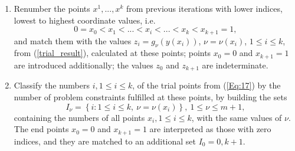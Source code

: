\documentclass{llncs}
\begin{document}
\begin{enumerate}
\item 
Renumber the points $x^1,...,x^k$ from previous iterations with lower indices, lowest to highest 
coordinate values, i.e.
\begin{equation}\label{Eq:17}
0=x_0<x_1<...<x_i<...<x_k<x_{k+1}=1,
\end{equation}
and match them with the values $z_i=g_\nu(y(x_i))$, $\nu=\nu(x_i)$, $1 \leq i \leq k$, from 
(\ref{trial_result}), calculated at these points; points $x_0=0$ and $x_{k+1}=1$ are introduced 
additionally; the values $z_0$ and $z_{k+1}$ are indeterminate.
\item
Classify the numbers $i,1\leq i \leq k$, of the trial points from (\ref{Eq:17}) by the number of 
problem constraints fulfilled at these points, by building the sets
\begin{equation}\label{Eq:18}
I_\nu = \left\{i: 1 \leq i \leq k,\ \nu = \nu(x_i)\right\},\ 1 \leq \nu \leq m+1,
\end{equation}
containing the numbers of all points $x_i,1\leq i \leq k$, with the same values of $\nu$. The end 
points $x_0=0$ and $x_{k+1}=1$ are interpreted as those with zero indices, and they are 
matched to an additional set $I_0={0,k+1}$. 


\end{enumerate}
\end{document}
